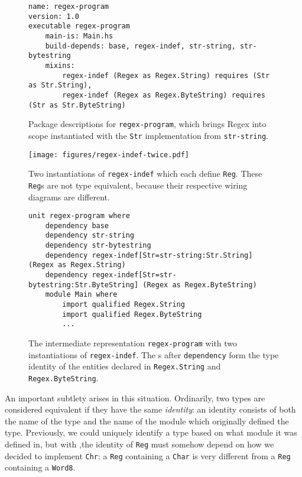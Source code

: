 \begin{figure}
\begin{lstlisting}[language=Cabal]
name: regex-program
version: 1.0
executable regex-program
    main-is: Main.hs
    build-depends: base, regex-indef, str-string, str-bytestring
    mixins:
        regex-indef (Regex as Regex.String) requires (Str as Str.String),
        regex-indef (Regex as Regex.ByteString) requires (Str as Str.ByteString)
\end{lstlisting}
\caption{Package descriptions for \texttt{regex-program}, which brings
Regex into scope instantiated with the \texttt{Str} implementation from \texttt{str-string}.}
\label{fig:regex-program-multi}
\end{figure}


\begin{figure}
\center\texttt{[image: figures/regex-indef-twice.pdf]}
\caption{Two instantiations of \texttt{regex-indef} which each define
\texttt{Reg}.  These \texttt{Reg}s are not type equivalent, because
their respective wiring diagrams are different.}
\label{fig:regex-indef-twice}
\end{figure}

\begin{figure}
\begin{lstlisting}
unit regex-program where
    dependency base
    dependency str-string
    dependency str-bytestring
    dependency regex-indef[Str=str-string:Str.String] (Regex as Regex.String)
    dependency regex-indef[Str=str-bytestring:Str.ByteString] (Regex as Regex.ByteString)
    module Main where
        import qualified Regex.String
        import qualified Regex.ByteString
        ...
\end{lstlisting}
\caption{The intermediate representation \texttt{regex-program} with two instantiations of \texttt{regex-indef}.  The \uid{}s after \texttt{dependency} form the type identity of the entities declared in \texttt{Regex.String} and \texttt{Regex.ByteString}.}
\label{fig:matcher-twice-bkp}
\end{figure}

An important subtlety arises in this situation.  Ordinarily, two types
are considered equivalent if they have the same \emph{identity}: an
identity consists of both the name of the type and the name of the
module which originally defined the type.  Previously, we could
uniquely identify a type based on what module it was defined in,
but with \Backpack{},the identity of \verb|Reg| must somehow
depend on how we decided to implement \verb|Chr|: a \verb|Reg|
containing a \verb|Char| is very different from a \verb|Reg| containing
a \verb|Word8|.

